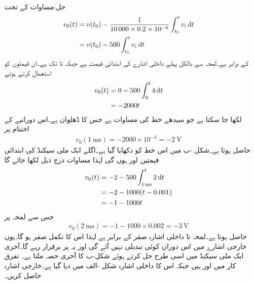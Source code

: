 حل:مساوات  کے تحت
\begin{align*}
v_0(t)&=v(t_0)-\frac{1}{\num{10000}\times 0.2\times 10^{-6} }\int_{t_0}^{t}v_i \dif t\\
&=v(t_0)-500\int_{t_0}^{t}v_i \dif t
\end{align*}
کے برابر ہے۔لمحہ  سے بالکل پہلے داخلی اشارے کی ابتدائی قیمت  ہے جبکہ  تا  تک  ہے۔ان قیمتوں کو استعمال کرتے ہوئے
\begin{align*}
v_0(t)&=0-500\int_0^{t} 4 \dif t\\
&=-2000 t
\end{align*}
لکھا جا سکتا ہے جو سیدھے خط کی مساوات ہے جس کا ڈھلوان  ہے۔اس دورانیے کے اختتام  پر
\begin{align*}
v_0(\SI{1}{\milli\second})=-2000 \times 10^{-3}=\SI{-2}{\volt}
\end{align*}
حاصل ہوتا ہے۔شکل -ب میں اس خط کو دکھایا گیا ہے۔اگلے ایک ملی سیکنڈ کی ابتدائی قیمتیں  اور  ہوں گی لہٰذا مساوات  درج ذیل لکھا جائے گا
\begin{align*}
v_0(t)&=-2-500\int_{\SI{1}{\milli\second}}^t 2\dif t\\
&=-2-1000(t-0.001)\\
&=-1-1000t
\end{align*}
جس سے  لمحہ  پر
\begin{align*}
v_0(\SI{2}{\milli\second})=-1-1000\times 0.002=\SI{-3}{\volt}
\end{align*}
حاصل ہوتا ہے۔لمحہ  تا  داخلی اشارہ صفر کے برابر ہے لہٰذا اس کا تکمل صفر ہو گا۔یوں خارجی اشارے میں اس دوران کوئی تبدیلی نہیں آئے گی اور یہ  پر برقرار رہے گا۔آخری ایک ملی سیکنڈ میں اسی طرح حل کرتے ہوئے شکل-ب کا آخری حصہ ملتا ہے۔ 
تفرق کار میں  اور  ہیں جبکہ اس کا داخلی اشارہ شکل -الف میں دیا گیا ہے۔خارجی اشارہ حاصل کریں۔

